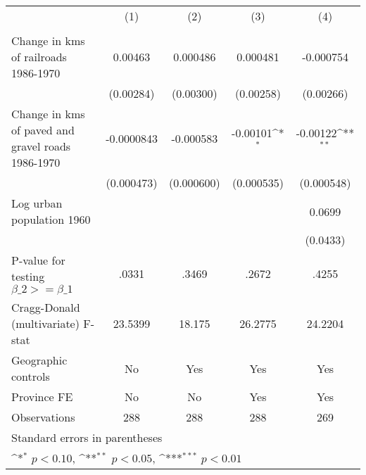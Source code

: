 {
\def\sym#1{\ifmmode^{#1}\else\(^{#1}\)\fi}
\begin{tabular}{l*{4}{c}}
\hline\hline
                &\multicolumn{1}{c}{(1)}&\multicolumn{1}{c}{(2)}&\multicolumn{1}{c}{(3)}&\multicolumn{1}{c}{(4)}\\
                &\multicolumn{1}{c}{}&\multicolumn{1}{c}{}&\multicolumn{1}{c}{}&\multicolumn{1}{c}{}\\
\hline
Change in kms of railroads 1986-1970&  0.00463         & 0.000486         & 0.000481         &-0.000754         \\
                &(0.00284)         &(0.00300)         &(0.00258)         &(0.00266)         \\
[1em]
Change in kms of paved and gravel roads 1986-1970&-0.0000843         &-0.000583         & -0.00101\sym{*}  & -0.00122\sym{**} \\
                &(0.000473)         &(0.000600)         &(0.000535)         &(0.000548)         \\
[1em]
Log urban population 1960&                  &                  &                  &   0.0699         \\
                &                  &                  &                  & (0.0433)         \\
\hline
P-value for testing $\beta\_{2} >= \beta\_{1}$&    .0331         &    .3469         &    .2672         &    .4255         \\
Cragg-Donald (multivariate) F-stat&  23.5399         &   18.175         &  26.2775         &  24.2204         \\
Geographic controls&       No         &      Yes         &      Yes         &      Yes         \\
Province FE     &       No         &       No         &      Yes         &      Yes         \\
Observations    &      288         &      288         &      288         &      269         \\
\hline\hline
\multicolumn{5}{l}{\footnotesize Standard errors in parentheses}\\
\multicolumn{5}{l}{\footnotesize \sym{*} \(p<0.10\), \sym{**} \(p<0.05\), \sym{***} \(p<0.01\)}\\
\end{tabular}
}
